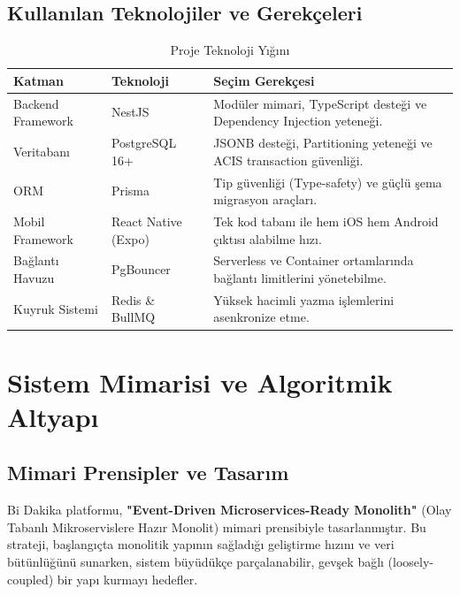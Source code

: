 \documentclass[12pt,a4paper]{report}
\begin{document}
\section{Kullanılan Teknolojiler ve Gerekçeleri}

\begin{table}[H]
    \centering
    \caption{Proje Teknoloji Yığını}
    \label{tab:tech-stack}
    \begin{tabular}{|p{4cm}|p{4cm}|p{6cm}|}
        \hline
        \textbf{Katman} & \textbf{Teknoloji} & \textbf{Seçim Gerekçesi} \\
        \hline
        Backend Framework & NestJS & Modüler mimari, TypeScript desteği ve Dependency Injection yeteneği. \\
        \hline
        Veritabanı & PostgreSQL 16+ & JSONB desteği, Partitioning yeteneği ve ACIS transaction güvenliği. \\
        \hline
        ORM & Prisma & Tip güvenliği (Type-safety) ve güçlü şema migrasyon araçları. \\
        \hline
        Mobil Framework & React Native (Expo) & Tek kod tabanı ile hem iOS hem Android çıktısı alabilme hızı. \\
        \hline
        Bağlantı Havuzu & PgBouncer & Serverless ve Container ortamlarında bağlantı limitlerini yönetebilme. \\
        \hline
        Kuyruk Sistemi & Redis \& BullMQ & Yüksek hacimli yazma işlemlerini asenkronize etme. \\
        \hline
    \end{tabular}
\end{table}

\chapter{Sistem Mimarisi ve Algoritmik Altyapı}

\section{Mimari Prensipler ve Tasarım}
Bi Dakika platformu, \textbf{"Event-Driven Microservices-Ready Monolith"} (Olay Tabanlı Mikroservislere Hazır Monolit) mimari prensibiyle tasarlanmıştır. Bu strateji, başlangıçta monolitik yapının sağladığı geliştirme hızını ve veri bütünlüğünü sunarken, sistem büyüdükçe parçalanabilir, gevşek bağlı (loosely-coupled) bir yapı kurmayı hedefler.
\end{document}
